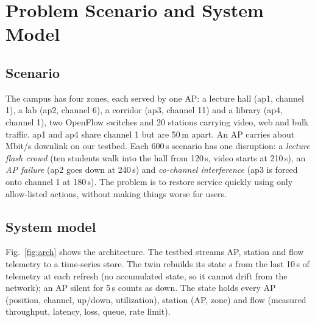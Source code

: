 \documentclass[conference]{IEEEtran}
\begin{document}
\section{Problem Scenario and System Model}
\subsection{Scenario}
The campus has four zones, each served by one AP: a lecture hall (ap1, channel 1), a lab (ap2, channel 6), a corridor (ap3, channel 11) and a library (ap4, channel 1), two OpenFlow switches and 20 stations carrying video, web and bulk traffic. ap1 and ap4 share channel 1 but are 50\,m apart. An AP carries about \CfgCapacity\,Mbit/s downlink on our testbed. Each 600\,s scenario has one disruption: a \emph{lecture flash crowd} (ten students walk into the hall from 120\,s, video starts at 210\,s), an \emph{AP failure} (ap2 goes down at 240\,s) and \emph{co-channel interference} (ap3 is forced onto channel 1 at 180\,s). The problem is to restore service quickly using only allow-listed actions, without making things worse for users.

\subsection{System model}
Fig.~\ref{fig:arch} shows the architecture. The testbed streams AP, station and flow telemetry to a time-series store. The twin rebuilds its state $s$ from the last 10\,s of telemetry at each refresh (no accumulated state, so it cannot drift from the network); an AP silent for 5\,s counts as down. The state holds every AP (position, channel, up/down, utilization), station (AP, zone) and flow (measured throughput, latency, loss, queue, rate limit).
\end{document}
